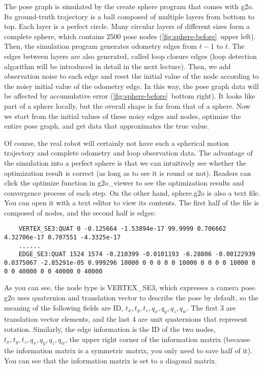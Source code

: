 The pose graph is simulated by the create sphere program that comes with g2o. Its ground-truth trajectory is a ball composed of multiple layers from bottom to top. Each layer is a perfect circle. Many circular layers of different sizes form a complete sphere, which contains 2500 pose nodes (\autoref{fig:sphere-before}~upper left). Then, the simulation program generates odometry edges from $t-1$ to $t$. The edges between layers are also generated, called loop closure edges (loop detection algorithm will be introduced in detail in the next lecture). Then, we add observation noise to each edge and reset the initial value of the node according to the noisy initial value of the odometry edge. In this way, the pose graph data will be affected by accumulative error (\autoref{fig:sphere-before}~bottom right). It looks like part of a sphere locally, but the overall shape is far from that of a sphere. Now we start from the initial values ​​of these noisy edges and nodes, optimize the entire pose graph, and get data that approximates the true value.

Of course, the real robot will certainly not have such a spherical motion trajectory and complete odometry and loop observation data. The advantage of the simulation into a perfect sphere is that we can intuitively see whether the optimization result is correct (as long as to see it is round or not). Readers can click the optimize function in g2o\_viewer to see the optimization results and convergence process of each step. On the other hand, sphere.g2o is also a text file. You can open it with a text editor to view its contents. The first half of the file is composed of nodes, and the second half is edges:

\begin{lstlisting}
	VERTEX_SE3:QUAT 0 -0.125664 -1.53894e-17 99.9999 0.706662 4.32706e-17 0.707551 -4.3325e-17 
	......
	EDGE_SE3:QUAT 1524 1574 -0.210399 -0.0101193 -6.28806 -0.00122939 0.0375067 -2.85291e-05 0.999296 10000 0 0 0 0 0 10000 0 0 0 0 10000 0 0 0 40000 0 0 40000 0 40000 
\end{lstlisting}

As you can see, the node type is VERTEX\_SE3, which expresses a camera pose. g2o uses quaternion and translation vector to describe the pose by default, so the meaning of the following fields are ID, $t_x, t_y, t_z, q_x, q_y, q_z, q_w$. The first 3 are translation vector elements, and the last 4 are unit quaternions that represent rotation. Similarly, the edge information is the ID of the two nodes, $t_x, t_y, t_z, q_x, q_y, q_z, q_w$, the upper right corner of the information matrix (because the information matrix is a symmetric matrix, you only need to save half of it). You can see that the information matrix is set to a diagonal matrix.

